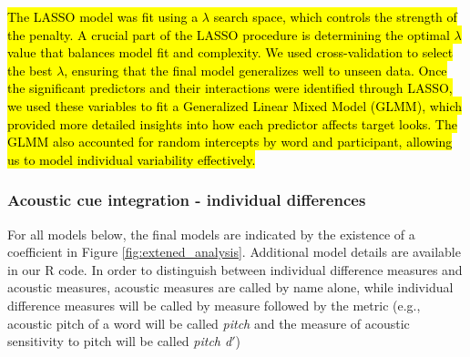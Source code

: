 \hl{The LASSO model was fit using a $\lambda$ search space, which controls the strength of the penalty. A crucial part of the LASSO procedure is determining the optimal $\lambda$ value that balances model fit and complexity. We used cross-validation to select the best $\lambda$, ensuring that the final model generalizes well to unseen data. Once the significant predictors and their interactions were identified through LASSO, we used these variables to fit a Generalized Linear Mixed Model (GLMM), which provided more detailed insights into how each predictor affects target looks. The GLMM also accounted for random intercepts by word and participant, allowing us to model individual variability effectively.}

\subsubsection{Acoustic cue integration - individual differences}

For all models below, the final models are indicated by the existence of a coefficient in Figure \ref{fig:extened_analysis}. Additional model details are available in our R code. In order to distinguish between individual difference measures and acoustic measures, acoustic measures are called by name alone, while individual difference measures will be called by measure followed by the metric (e.g., acoustic pitch of a word will be called \textit{pitch} and the measure of acoustic sensitivity to pitch will be called \textit{pitch d$'$}) 

